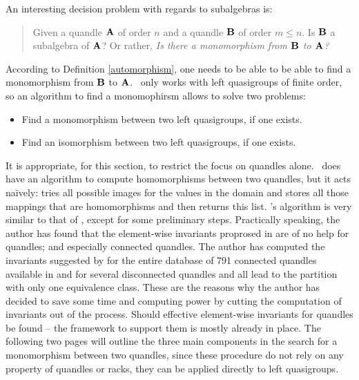 \documentclass{mcom-l}
\begin{document}
An interesting decision problem with regards to subalgebras is: 
\begin{quote}
    Given a quandle $\mathbf{A}$ of order $n$ and a quandle $\mathbf{B}$ of order $m\leq n$. \newline Is $\mathbf{B}$ a subalgebra of $\mathbf{A}$? Or rather, \emph{Is there a monomorphism from $\mathbf{B}$ to $\mathbf{A}$?}
\end{quote}
\label{monomorphismAlgo}
According to Definition \ref{automorphism}, one needs to be able to be able to find a monomorphism from $\mathbf{B}$ to $\mathbf{A}$. \Software~only works with left quasigroups of finite order, so an algorithm to find a monomophirsm allows to solve two problems:
\begin{itemize}
    \item Find a monomorphism between two left quasigroups, if one exists.
    \item Find an isomorphism between two left quasigroups, if one exists. 
\end{itemize}
It is appropriate, for this section, to restrict the focus on quandles alone.\newline
\rig~does have an algorithm to compute homomorphisms between two quandles, but it acts naïvely: tries all possible images for the values in the domain and stores all those mappings that are homomorphisms and then returns this list.\newline\newline
\Software's algorithm is very similar to that of \cream, except for some preliminary steps.
Practically speaking, the author has found that the element-wise invariants proprosed in \cite{Araujo2022CREAMAP} are of no help for quandles; and especially connected quandles. The author has computed the invariants suggested by \cite{Araujo2022CREAMAP} for the entire database of 791 connected quandles available in \cite{RiGapVendramin} and for several disconnected quandles and all lead to the partition with only one equivalence class. These are the reasons why the author has decided to save some time and computing power by cutting the computation of invariants out of the process. \newline Should effective element-wise invariants for quandles be found -- the framework to support them is mostly already in place. The following two pages will outline the three main components in the search for a monomorphism between two quandles, since these procedure do not rely on any property of quandles or racks, they can be applied directly to left quasigroups.
\end{document}
